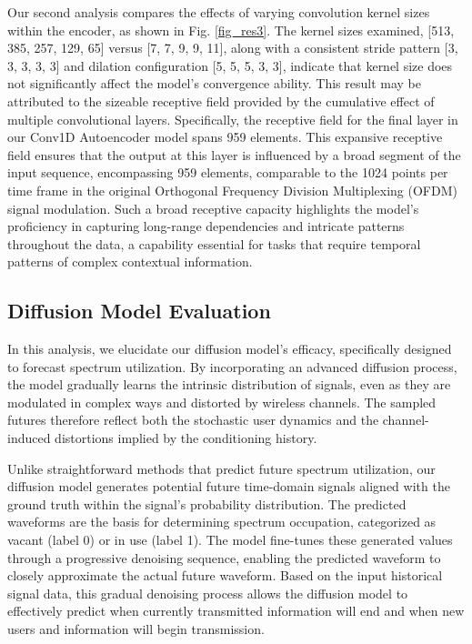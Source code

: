 \documentclass[lettersize,journal]{IEEEtran}
\begin{document}
Our second analysis compares the effects of varying convolution kernel sizes within the encoder, as shown in Fig. \ref{fig_res3}. The kernel sizes examined, [513, 385, 257, 129, 65] versus [7, 7, 9, 9, 11], along with a consistent stride pattern [3, 3, 3, 3, 3] and dilation configuration [5, 5, 5, 3, 3], indicate that kernel size does not significantly affect the model's convergence ability. This result may be attributed to the sizeable receptive field provided by the cumulative effect of multiple convolutional layers. Specifically, the receptive field for the final layer in our Conv1D Autoencoder model spans 959 elements. This expansive receptive field ensures that the output at this layer is influenced by a broad segment of the input sequence, encompassing 959 elements, comparable to the 1024 points per time frame in the original Orthogonal Frequency Division Multiplexing (OFDM) signal modulation. Such a broad receptive capacity highlights the model's proficiency in capturing long-range dependencies and intricate patterns throughout the data, a capability essential for tasks that require temporal patterns of complex contextual information.

\subsection{Diffusion Model Evaluation}
In this analysis, we elucidate our diffusion model's efficacy, specifically designed to forecast spectrum utilization. By incorporating an advanced diffusion process, the model gradually learns the intrinsic distribution of signals, even as they are modulated in complex ways and distorted by wireless channels. The sampled futures therefore reflect both the stochastic user dynamics and the channel-induced distortions implied by the conditioning history.

Unlike straightforward methods that predict future spectrum utilization, our diffusion model generates potential future time-domain signals aligned with the ground truth within the signal's probability distribution. The predicted waveforms are the basis for determining spectrum occupation, categorized as vacant (label 0) or in use (label 1). The model fine-tunes these generated values through a progressive denoising sequence, enabling the predicted waveform to closely approximate the actual future waveform. Based on the input historical signal data, this gradual denoising process allows the diffusion model to effectively predict when currently transmitted information will end and when new users and information will begin transmission.
\end{document}
